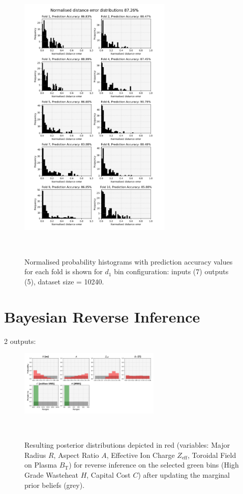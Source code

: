 \begin{figure}[h!]
    \centering
    \includegraphics[width=0.65\textwidth]{figures/validation_plots/TE/k-fold_two_outputs.png}
    \caption{\small Normalised probability histograms with prediction accuracy values for each fold is shown for $d_{1}$ bin configuration: inputs (7) outputs (5), dataset size = 10240.}~\label{fig:k-foldhistogramsTE}
\end{figure}

\newpage
\section{Bayesian Reverse Inference}

2 outputs: 

\begin{figure}[ht]
    \centering
    \includegraphics[width=0.6\textwidth]{figures/TE_results/march_data/config(57)_2outputs_1.png}
    \caption{Resulting posterior distributions depicted in red (variables: Major Radius $R$, Aspect Ratio $A$, Effective Ion Charge $Z_{\text{eff}}$, Toroidal Field on Plasma $B_{\text{T}}$) for reverse
    inference on the selected green bins (High Grade Wasteheat $H$, Capital Cost $C$) after updating the marginal prior beliefs (grey).}~\label{fig:config(57)_2outputs_1}
\end{figure}

